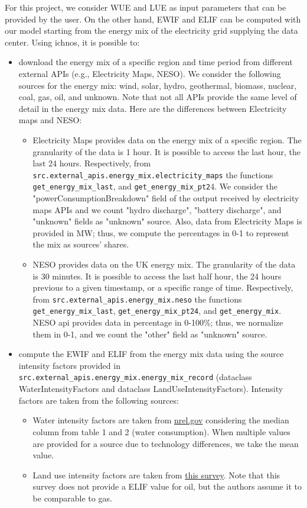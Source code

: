 \documentclass{article}
\begin{document}
For this project, we consider WUE and LUE as input parameters that can be provided by the user. On the other hand, EWIF and ELIF can be computed with our model starting from the energy mix of the electricity grid supplying the data center.
Using ichnos, it is possible to:
\begin{itemize}
    \item download the energy mix of a specific region and time period from different external APIs (e.g., Electricity Maps, NESO). We consider the following sources for the energy mix: wind, solar, hydro, geothermal, biomass, nuclear, coal, gas, oil, and unknown.
    Note that not all APIs provide the same level of detail in the energy mix data. Here are the differences between Electricity maps and NESO:
    \begin{itemize}
        \item Electricity Maps provides data on the energy mix of a specific region. The granularity of the data is 1 hour. It is possible to access the last hour, the last 24 hours. Respectively, from \verb|src.external_apis.energy_mix.electricity_maps| the functions \verb|get_energy_mix_last|, and \verb|get_energy_mix_pt2|4.
        We consider the "powerConsumptionBreakdown" field of the output received by electricity maps APIs and we count "hydro discharge", "battery discharge", and "unknown" fields as "unknown" source. Also, data from Electricity Maps is provided in MW; thus, we compute the percentages in 0-1 to represent the mix as sources' shares.
        \item NESO provides data on the UK energy mix. The granularity of the data is 30 minutes. It is possible to access the last half hour, the 24 hours previous to a given timestamp, or a specific range of time. Respectively, from \verb|src.external_apis.energy_mix.neso| the functions \verb|get_energy_mix_last|, \verb|get_energy_mix_pt24|, and \verb|get_energy_mix|. NESO api provides data in percentage in 0-100\%; thus, we normalize them in 0-1, and we count the "other" field as "unknown" source.
    \end{itemize}
    \item compute the EWIF and ELIF from the energy mix data using the source intensity factors provided in \verb|src.external_apis.energy_mix.energy_mix_record| (dataclass WaterIntensityFactors and dataclass LandUseIntensityFactors). Intensity factors are taken from the following sources:
    \begin{itemize}
        \item Water intensity factors are taken from \href{https://www.nrel.gov/docs/fy11osti/50900.pdf}{nrel.gov} considering the median column from table 1 and 2 (water consumption). When multiple values are provided for a source due to technology differences, we take the mean value.
        \item Land use intensity factors are taken from \href{https://journals.plos.org/plosone/article?id=10.1371/journal.pone.0270155.}{this survey}. Note that this survey does not provide a ELIF value for oil, but the authors assume it to be comparable to gas.
    \end{itemize}
\end{itemize}
\end{document}
